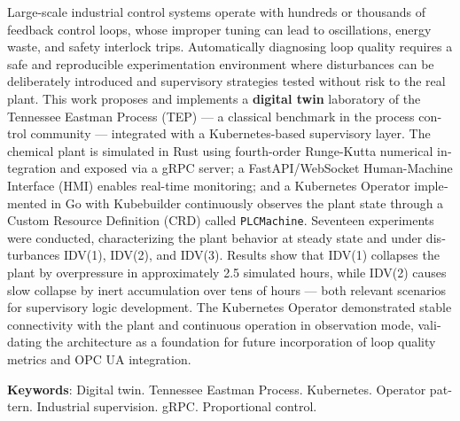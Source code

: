 
\begin{resumo}[ABSTRACT]
\begin{otherlanguage}{english}
\vspace*{-6mm}

Large-scale industrial control systems operate with hundreds or thousands of feedback control loops, whose improper tuning can lead to oscillations, energy waste, and safety interlock trips. Automatically diagnosing loop quality requires a safe and reproducible experimentation environment where disturbances can be deliberately introduced and supervisory strategies tested without risk to the real plant. This work proposes and implements a \textbf{digital twin} laboratory of the Tennessee Eastman Process (TEP) — a classical benchmark in the process control community — integrated with a Kubernetes-based supervisory layer. The chemical plant is simulated in Rust using fourth-order Runge-Kutta numerical integration and exposed via a gRPC server; a FastAPI/WebSocket Human-Machine Interface (HMI) enables real-time monitoring; and a Kubernetes Operator implemented in Go with Kubebuilder continuously observes the plant state through a Custom Resource Definition (CRD) called \texttt{PLCMachine}. Seventeen experiments were conducted, characterizing the plant behavior at steady state and under disturbances IDV(1), IDV(2), and IDV(3). Results show that IDV(1) collapses the plant by overpressure in approximately 2.5 simulated hours, while IDV(2) causes slow collapse by inert accumulation over tens of hours — both relevant scenarios for supervisory logic development. The Kubernetes Operator demonstrated stable connectivity with the plant and continuous operation in observation mode, validating the architecture as a foundation for future incorporation of loop quality metrics and OPC UA integration.

\textbf{Keywords}: Digital twin. Tennessee Eastman Process. Kubernetes. Operator pattern. Industrial supervision. gRPC. Proportional control.
  \end{otherlanguage}
\end{resumo}
